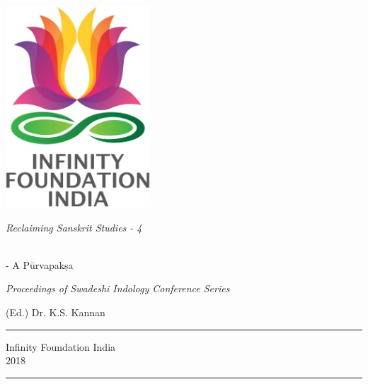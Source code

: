 \thispagestyle{empty}
\begin{center}
\includegraphics[scale=0.3]{figures/logo.png}
\bigskip

{\fontsize{10}{14}\selectfont\sl
Reclaiming Sanskrit Studies - 4}

\bigskip
\end{center}
\medskip

\begin{center}
{\fontsize{20}{24}\selectfont {\sl W\,E\,S\,T\,E\,R\,N\,\, I\,N\,D\,O\,L\,O\,G\,Y\,\\[8pt]
O\,N\,\, R\,A\,S\,A}}\\[10pt]
{\fontsize{20}{24}\selectfont - A Pūrvapakṣa}
\bigskip

{\sl\small Proceedings of Swadeshi Indology Conference Series}

\vfill


{\fontsize{14}{18}\selectfont 
(Ed.) Dr. K.S. Kannan\par
}
\vfill

\rule{5cm}{1pt}

{\fontsize{12}{14}\selectfont
Infinity Foundation India\\[4pt]
2018}

\rule{5cm}{1pt}
\end{center}




